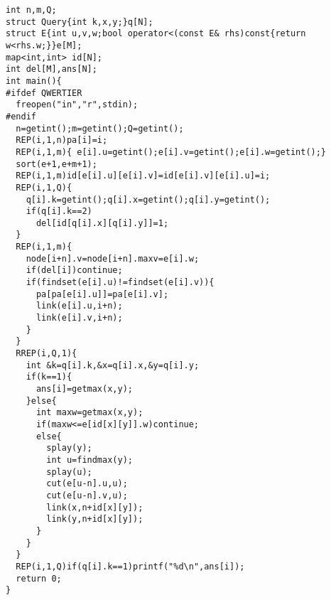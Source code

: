 \begin{lstlisting}
int n,m,Q;
struct Query{int k,x,y;}q[N];
struct E{int u,v,w;bool operator<(const E& rhs)const{return w<rhs.w;}}e[M];
map<int,int> id[N];
int del[M],ans[N];
int main(){
#ifdef QWERTIER
  freopen("in","r",stdin);
#endif
  n=getint();m=getint();Q=getint();
  REP(i,1,n)pa[i]=i;
  REP(i,1,m){ e[i].u=getint();e[i].v=getint();e[i].w=getint();}
  sort(e+1,e+m+1);
  REP(i,1,m)id[e[i].u][e[i].v]=id[e[i].v][e[i].u]=i;
  REP(i,1,Q){
    q[i].k=getint();q[i].x=getint();q[i].y=getint();
    if(q[i].k==2)
      del[id[q[i].x][q[i].y]]=1;
  }
  REP(i,1,m){
    node[i+n].v=node[i+n].maxv=e[i].w;
    if(del[i])continue;
    if(findset(e[i].u)!=findset(e[i].v)){
      pa[pa[e[i].u]]=pa[e[i].v];
      link(e[i].u,i+n);
      link(e[i].v,i+n);
    }
  }
  RREP(i,Q,1){
    int &k=q[i].k,&x=q[i].x,&y=q[i].y;
    if(k==1){
      ans[i]=getmax(x,y);
    }else{
      int maxw=getmax(x,y);
      if(maxw<=e[id[x][y]].w)continue;
      else{
        splay(y);
        int u=findmax(y);
        splay(u);
        cut(e[u-n].u,u);
        cut(e[u-n].v,u);
        link(x,n+id[x][y]);
        link(y,n+id[x][y]);
      }
    }
  }
  REP(i,1,Q)if(q[i].k==1)printf("%d\n",ans[i]);
  return 0;
}

\end{lstlisting}
